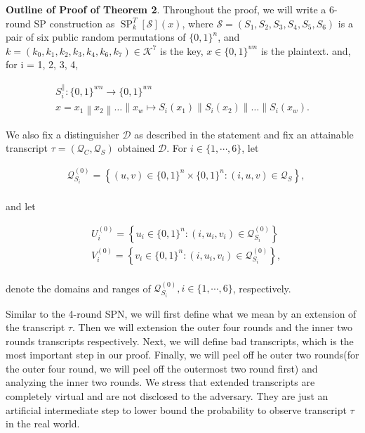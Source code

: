 \noindent \textbf{Outline of Proof of Theorem 2}. Throughout the proof, we will write a 6-round SP construction as $\operatorname{SP}^T_{k}[\mathcal{S}](x)$, where $\mathcal{S}=(S_1, S_2, S_3, S_4, S_5, S_6)$  is a pair of six public random permutations of $\{0,1\}^{n}$, and $k = (k_{0}, k_{1}, k_{2}, k_{3}, k_{4}, k_{6}, k_{7}) \in \mathcal{K}^{7}$ is the key, $x \in \{0,1\}^{w n}$ is the plaintext. and, for i = 1, 2, 3, 4,

$$
\begin{array}{c}
{S_{i}^{\|}:\{0,1\}^{w n} \rightarrow\{0,1\}^{w n}} \\
{x=x_{1}\left\|x_{2}\right\| \ldots\left\|x_{w} \longmapsto S_{i}\left(x_{1}\right)\right\| S_{i}\left(x_{2}\right)\|\ldots\| S_{i}\left(x_{w}\right)}.
\end{array}
$$

We also fix a distinguisher $\mathcal{D}$ as described in the statement and fix an attainable transcript $\tau =\left(\mathcal{Q}_{C}, \mathcal{Q}_{S}\right)$ obtained $\mathcal{D}$. For $i \in \{1, \cdots, 6\}$, let

$$
\begin{aligned}
&\mathcal{Q}_{S_{i}}^{(0)}=\left\{(u, v) \in\{0,1\}^{n} \times\{0,1\}^{n}:(i, u, v) \in \mathcal{Q}_{S} \right\},\\
\end{aligned}
$$

\noindent and let

$$
\begin{aligned}
&U_{i}^{(0)}=\left\{u_{i} \in\{0,1\}^{n}:\left(i, u_{i}, v_{i}\right) \in \mathcal{Q}_{S_{i}}^{(0)}\right\}\\
&V_{i}^{(0)}=\left\{v_{i} \in\{0,1\}^{n}:\left(i, u_{i}, v_{i}\right) \in \mathcal{Q}_{S_{i}}^{(0)}\right\},\\
\end{aligned}
$$

\noindent denote the domains and ranges of $\mathcal{Q}_{S_{i}}^{(0)}, i \in \{1, \cdots, 6\}$, respectively.

Similar to the 4-round SPN, we will first define what we mean by an extension of the transcript $\tau$. Then we will extension the outer four rounds and the inner two rounds transcripts respectively. Next, we will define bad transcripts, which is the most important step in our proof. Finally, we will peel off he outer two rounds(for the outer four round, we will peel off the outermost two round first) and analyzing the inner two rounds. We stress that extended transcripts are completely virtual and are not disclosed to the adversary. They are just an artificial intermediate step to lower bound the probability to observe transcript $\tau$ in the real world.\\

